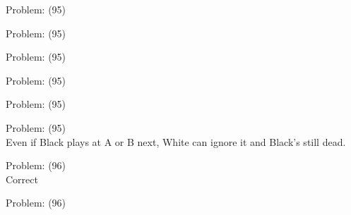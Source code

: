 \documentclass[11pt]{article}
\begin{document}
\begin{minipage}[t]{0.5\textwidth}
  {\centering
  
Problem: (95)\\
  }
\end{minipage}
\begin{minipage}[t]{0.5\textwidth}
  {\centering
  
Problem: (95)\\
  }
\end{minipage}
\begin{minipage}[t]{0.5\textwidth}
  {\centering
  
Problem: (95)\\
  }
\end{minipage}
\begin{minipage}[t]{0.5\textwidth}
  {\centering
  
Problem: (95)\\
  }
\end{minipage}
\begin{minipage}[t]{0.5\textwidth}
  {\centering
  
Problem: (95)\\
  }
\end{minipage}
\begin{minipage}[t]{0.5\textwidth}
  {\centering
  
Problem: (95)\\
Even if Black plays at A or B next, White can ignore it and Black's still dead.\\
  }
\end{minipage}
\begin{minipage}[t]{0.5\textwidth}
  {\centering
  
Problem: (96)\\
Correct\\
  }
\end{minipage}
\begin{minipage}[t]{0.5\textwidth}
  {\centering
  
Problem: (96)\\
  }
\end{minipage}
\end{document}
